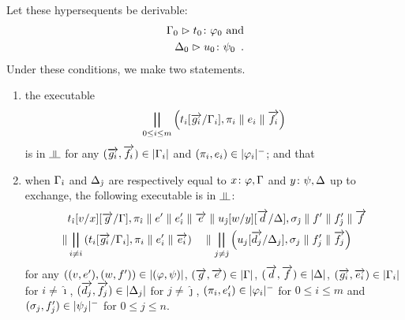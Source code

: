 \begin{proposition}[Adequacy]
 Let these hypersequents be derivable:
 \begin{align*}
  {\Gamma_0}\vartriangleright{ {t_0} \colon{\varphi_0} }
  \text{ and}\\
  {\Delta_0}\vartriangleright{ {u_0} \colon{\psi_0} }\enspace.
 \end{align*}
 Under these conditions, we make two statements.
 \begin{enumerate}[label=(\arabic{*}), ref=\textit{(\arabic{*})}]
  \item \label{c:first} the executable
	\[
	\bigparallel_{0\le i\le m}
	\left(t_i[\overrightarrow{g_i}/\Gamma_i], \pi_i\parallel e_i\parallel \overrightarrow{f_i}\right)
	\]
	is in $\bbot$
	 for any
	$(\overrightarrow{g_i},\overrightarrow{f_i})\in|{\Gamma_i}|$ and $(\pi_i, e_i)\in|{\varphi_i}|^-$; and that
  \item \label{c:second}
	when $\Gamma_{\hat\imath}$ and $\Delta_{\hat\jmath}$ are respectively
	equal to ${x} \colon{\varphi}, \Gamma$ and ${y} \colon{\psi}, \Delta$ up to exchange,
	the following executable is in $\bbot$:
	\begin{align*}
	 &
	 t_{\hat\imath}[v/x][\overrightarrow{g}/\Gamma],\pi_{\hat\imath}
	 \parallel e'\parallel e'_{\hat\imath} \parallel \overrightarrow e\parallel
	 u_{\hat\jmath}[w/y][\overrightarrow d /\Delta],
	 \sigma_{\hat\jmath}\parallel f'\parallel f'_{\hat\jmath}\parallel \overrightarrow f \\ \parallel
	&\bigparallel_{i\neq\hat\imath} \left(t_i[\overrightarrow{g_i}/\Gamma_i],
	\pi_i\parallel e'_i\parallel \overrightarrow{e_i}\right)
	 \quad \parallel
	\bigparallel_{j\neq\hat\jmath} \left(u_j[\overrightarrow{d_j}/\Delta_j],
	\sigma_j\parallel f'_j\parallel {\overrightarrow{f_j}}\right)
	\end{align*}
	for any
	$((v,e'),(w,f'))    \in |{(\varphi,\psi)}|$,
	$(\overrightarrow{g},\overrightarrow{e})  \in |{\Gamma}|$,
	$(\overrightarrow d,\overrightarrow{f})   \in |{\Delta}|$,
	$(\overrightarrow{g_i},\overrightarrow{e_i})\in |{\Gamma_i}|$ for $i\neq\hat\imath$,
	$(\overrightarrow{d_j},\overrightarrow{f_j})\in |{\Delta_j}|$ for $j\neq\hat\jmath$,
	$(\pi_i,e'_i)    \in |{\varphi_i}|^-$   for $0\le i\le m$ and
	$(\sigma_j,f'_j) \in |{\psi_j}|^-$   for $0\le j\le n$.
  \end{enumerate}
 \end{proposition}
